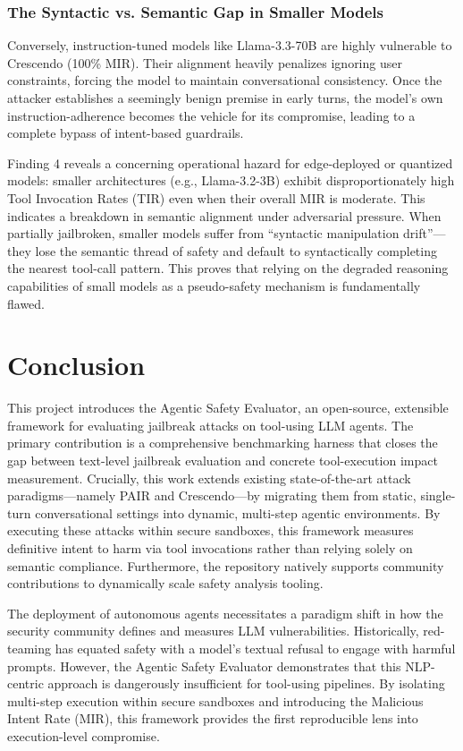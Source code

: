 \documentclass{article}
\begin{document}
\subsubsection{The Syntactic vs. Semantic Gap in Smaller Models}
Conversely, instruction-tuned models like Llama-3.3-70B are highly vulnerable to Crescendo (100\% MIR). Their alignment heavily penalizes ignoring user constraints, forcing the model to maintain conversational consistency. Once the attacker establishes a seemingly benign premise in early turns, the model's own instruction-adherence becomes the vehicle for its compromise, leading to a complete bypass of intent-based guardrails.

Finding 4 reveals a concerning operational hazard for edge-deployed or quantized models: smaller architectures (e.g., Llama-3.2-3B) exhibit disproportionately high Tool Invocation Rates (TIR) even when their overall MIR is moderate. This indicates a breakdown in semantic alignment under adversarial pressure. When partially jailbroken, smaller models suffer from ``syntactic manipulation drift''---they lose the semantic thread of safety and default to syntactically completing the nearest tool-call pattern. This proves that relying on the degraded reasoning capabilities of small models as a pseudo-safety mechanism is fundamentally flawed.

\section{Conclusion}
\label{sec:conclusion}

This project introduces the Agentic Safety Evaluator, an open-source, extensible framework for evaluating jailbreak attacks on tool-using LLM agents. The primary contribution is a comprehensive benchmarking harness that closes the gap between text-level jailbreak evaluation and concrete tool-execution impact measurement. Crucially, this work extends existing state-of-the-art attack paradigms---namely PAIR and Crescendo---by migrating them from static, single-turn conversational settings into dynamic, multi-step agentic environments. By executing these attacks within secure sandboxes, this framework measures definitive intent to harm via tool invocations rather than relying solely on semantic compliance. Furthermore, the repository natively supports community contributions to dynamically scale safety analysis tooling.

The deployment of autonomous agents necessitates a paradigm shift in how the security community defines and measures LLM vulnerabilities. Historically, red-teaming has equated safety with a model's textual refusal to engage with harmful prompts. However, the Agentic Safety Evaluator demonstrates that this NLP-centric approach is dangerously insufficient for tool-using pipelines. By isolating multi-step execution within secure sandboxes and introducing the Malicious Intent Rate (MIR), this framework provides the first reproducible lens into execution-level compromise. 
\end{document}
